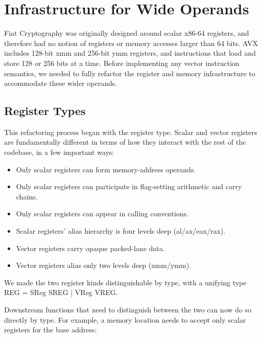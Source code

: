 \chapter{Infrastructure for Wide Operands}
\label{ch:infrastructure}

Fiat Cryptography was originally designed around scalar x86-64 registers, and therefore had no notion of registers or memory accesses larger than 64 bits.
AVX includes 128-bit xmm and 256-bit ymm registers, and instructions that load and store 128 or 256 bits at a time.
Before implementing any vector instruction semantics, we needed to fully refactor the register and memory infrastructure to accommodate these wider operands.

\section{Register Types}
\label{sec:reg-types}

This refactoring process began with the register type.
Scalar and vector registers are fundamentally different in terms of how they interact with the rest of the codebase, in a few important ways:

\begin{itemize}
    \item Only scalar registers can form memory-address operands.
    \item Only scalar registers can participate in flag-setting arithmetic and carry chains.
    \item Only scalar registers can appear in calling conventions.
    \item Scalar registers' alias hierarchy is four levels deep (al/ax/eax/rax).
    \item Vector registers carry opaque packed-lane data.
    \item Vector registers alias only two levels deep (xmm/ymm).
\end{itemize}

We made the two register kinds distinguishable by type, with a unifying type REG = SReg SREG | VReg VREG.


Downstream functions that need to distinguish between the two can now do so directly by type.
For example, a memory location needs to accept only scalar registers for the base address:

